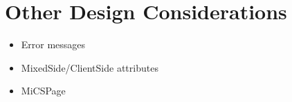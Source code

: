 \section{Other Design Considerations}
\begin{itemize}
	\item Error messages
	\item MixedSide/ClientSide attributes
	\item MiCSPage
\end{itemize}